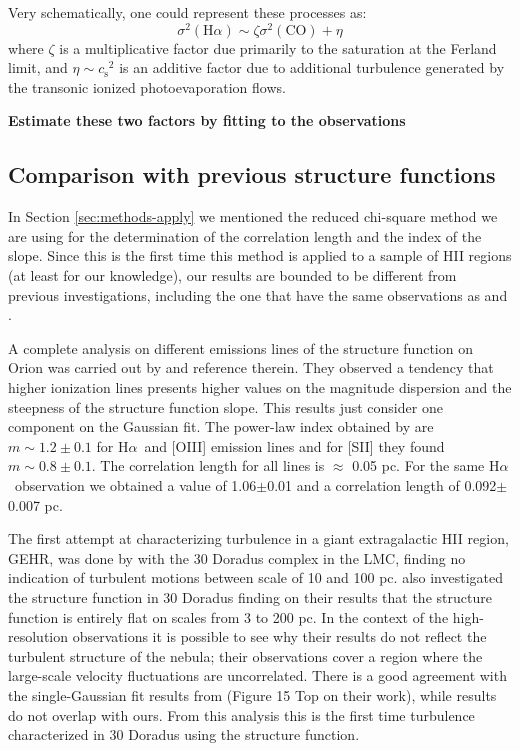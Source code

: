 \documentclass[fleqn,usenatbib, useAMS, a4paper]{mnras}
\newcommand\halpha{H${\alpha}$}
\newcommand\ha{\ensuremath{\text{H}\alpha}}
\newcommand*\chem[1]{\ensuremath{\mathrm{#1}}}
\newcommand\csound{\ensuremath{c_{\text{s}}}}
\begin{document}
Very schematically, one could represent these processes as:
\begin{equation}
  \label{eq:1}
  \sigma^2(\ha) \sim \zeta \sigma^2(\chem{CO}) + \eta
\end{equation}
where \(\zeta\) is a multiplicative factor
due primarily to the saturation at the Ferland limit,
and \(\eta \sim \csound^2\) is an additive factor due to additional turbulence
generated by the transonic ionized photoevaporation flows.

\textbf{Estimate these two factors by fitting to the observations}

\subsection{Comparison with previous structure functions}

In Section \ref{sec:methods-apply} we mentioned the reduced chi-square method we are using for the determination of the correlation length and the index of the slope. Since this is the first time this method is applied to a sample of HII regions (at least for our knowledge), our results are bounded to be different from previous investigations, including the one that have the same observations as \citet{arthur2016turbulence} and \citet{2019arXiv191203543M}. 

A complete analysis on different emissions lines of the structure function on Orion was carried out by \citet{arthur2016turbulence} and reference therein. 
They observed a tendency that higher ionization lines presents higher values on the magnitude dispersion and the steepness of the structure function slope. 
This results just consider one component on the Gaussian fit. 
The power-law index obtained by \citet{arthur2016turbulence} are \(m \sim 1.2 \pm 0.1\) for \halpha\ and [OIII] emission lines and for [SII] they found \(m \sim 0.8 \pm 0.1\). 
The correlation length for all lines is \(\approx\) 0.05 pc. For the same \halpha\ observation we obtained a value of 1.06$\pm$0.01 and a correlation length of 0.092$\pm$0.007 pc. 

The first attempt at characterizing turbulence in a giant extragalactic HII region, GEHR, was done by \citet{1961MNRAS.122....1F} with the 30 Doradus complex in the LMC, finding no indication of turbulent motions between scale of 10 and 100 pc.
\citet{Melnick:2021x} also investigated the structure function in 30 Doradus finding on their results that the structure function is entirely flat on scales from 3 to 200 pc.
In the context of the high-resolution observations it is possible to see why their results do not reflect the turbulent structure of the nebula; their observations cover a region where the large-scale velocity fluctuations are uncorrelated.
There is a good agreement with the single-Gaussian fit results from \citet{2019arXiv191203543M} (Figure 15 Top on their work), while \citet{1961MNRAS.122....1F} results do not overlap with ours.
From this analysis this is the first time turbulence characterized in 30 Doradus using the structure function.
\end{document}
